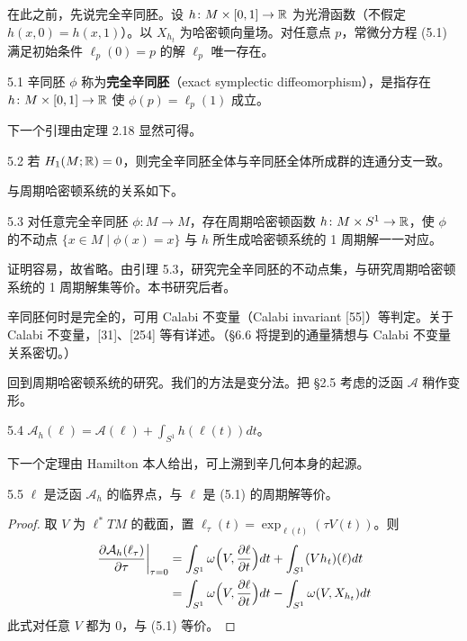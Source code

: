 在此之前，先说完全辛同胚。设 $h\colon M\times[0,1]\to\mathbb{R}$ 为光滑函数（不假定 $h(x,0)=h(x,1)$）。以 $X_{h_t}$ 为哈密顿向量场。对任意点 $p$，常微分方程 (5.1) 满足初始条件 $\ell_p(0)=p$ 的解 $\ell_p$ 唯一存在。

\begin{definition}{5.1}
  辛同胚 $\phi$ 称为\textbf{完全辛同胚}（exact symplectic diffeomorphism），是指存在 $h\colon M\times[0,1]\to\mathbb{R}$ 使 $\phi(p)=\ell_p(1)$ 成立。
\end{definition}

下一个引理由定理 2.18 显然可得。

\begin{lemma}{5.2}
  若 $H_1(M;\mathbb{R})=0$，则完全辛同胚全体与辛同胚全体所成群的连通分支一致。
\end{lemma}

与周期哈密顿系统的关系如下。

\begin{lemma}{5.3}
  对任意完全辛同胚 $\phi\colon M\to M$，存在周期哈密顿函数 $h\colon M\times S^1\to\mathbb{R}$，使 $\phi$ 的不动点 $\{x\in M\mid\phi(x)=x\}$ 与 $h$ 所生成哈密顿系统的 1 周期解一一对应。
\end{lemma}

证明容易，故省略。由引理 5.3，研究完全辛同胚的不动点集，与研究周期哈密顿系统的 1 周期解集等价。本书研究后者。

辛同胚何时是完全的，可用 Calabi 不变量（Calabi invariant [55]）等判定。关于 Calabi 不变量，[31]、[254] 等有详述。（§6.6 将提到的通量猜想与 Calabi 不变量关系密切。）

回到周期哈密顿系统的研究。我们的方法是变分法。把 §2.5 考虑的泛函 $\mathcal{A}$ 稍作变形。

\begin{definition}{5.4}
  $\mathcal{A}_h(\ell)=\mathcal{A}(\ell)+\int_{S^1}h(\ell(t))dt$。
\end{definition}

下一个定理由 Hamilton 本人给出，可上溯到辛几何本身的起源。

\begin{theorem*}{5.5}
  $\ell$ 是泛函 $\mathcal{A}_h$ 的临界点，与 $\ell$ 是 (5.1) 的周期解等价。
\end{theorem*}

\begin{proof}
  取 $V$ 为 $\ell^*TM$ 的截面，置 $\ell_\tau(t)=\exp_{\ell(t)}(\tau V(t))$。则
  \begin{align*}
    \left.\frac{\partial\mathcal{A}_h(\ell_\tau)}{\partial\tau}\right|_{\tau=0}
    &=\int_{S^1}\omega\Bigl(V,\frac{\partial\ell}{\partial t}\Bigr)dt+\int_{S^1}(Vh_t)(\ell)dt\\
    &=\int_{S^1}\omega\Bigl(V,\frac{\partial\ell}{\partial t}\Bigr)dt-\int_{S^1}\omega(V,X_{h_t})dt
  \end{align*}
  此式对任意 $V$ 都为 0，与 (5.1) 等价。
\end{proof}

